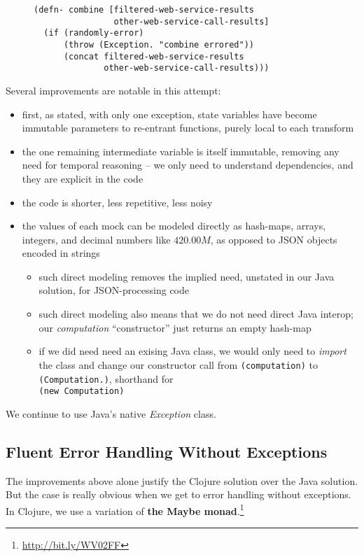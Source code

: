 \documentclass[11pt]{article}
\begin{document}
\begin{figure}[H]
\label{functional-helpers-5}
\begin{verbatim}
(defn- combine [filtered-web-service-results
                other-web-service-call-results]
  (if (randomly-error)
      (throw (Exception. "combine errored"))
      (concat filtered-web-service-results
              other-web-service-call-results)))
\end{verbatim}
\end{figure}

Several improvements are notable in this attempt:
\begin{itemize}
\item first, as stated, with only one exception, state variables have
become immutable parameters to re-entrant functions, purely local
to each transform
\item the one remaining intermediate variable is itself immutable,
removing any need for temporal reasoning -- we only need to
understand dependencies, and they are explicit in the code
\item the code is shorter, less repetitive, less noisy
\item the values of each mock can be modeled directly as hash-maps,
arrays, integers, and decimal numbers like $420.00M$, as opposed
to JSON objects encoded in strings
\begin{itemize}
\item such direct modeling removes the implied need, unstated in our
Java solution, for JSON-processing code
\item such direct modeling also means that we do not need direct Java
interop; our \emph{computation} ``constructor'' just returns an empty
hash-map
\item if we did need need an exising Java class, we would only need to
      \emph{import} the class and change our constructor call from
      \verb|(computation)| to \verb|(Computation.)|, shorthand for \\
      \verb|(new Computation)|
\end{itemize}
\end{itemize}

We continue to use Java's native \emph{Exception} class.
\subsection{Fluent Error Handling Without Exceptions}
\label{sec-3-2}

The improvements above alone justify the Clojure solution over the
Java solution. But the case is really obvious when we get to error
handling without exceptions. In Clojure, we use a variation of
\textbf{the Maybe monad}.\footnote{\url{http://bit.ly/WV02FF}}
\end{document}
